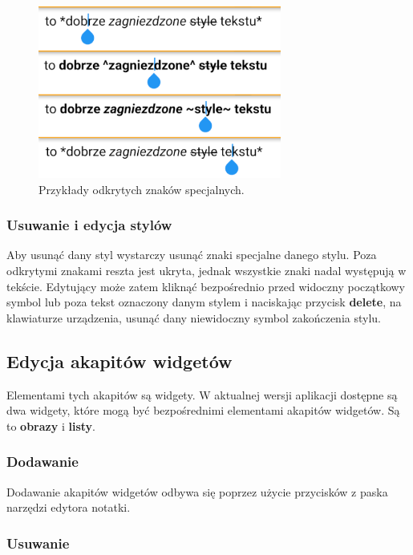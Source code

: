 \begin{figure}[ht]
    \centering
    \includegraphics[width=8cm]{images/pokazywanie_znakow_specjalnych.png}
    \caption{Przykłady odkrytych znaków specjalnych.}
    \vspace{3mm}
\end{figure}

\subsubsection{Usuwanie i edycja stylów}

Aby usunąć dany styl wystarczy usunąć znaki specjalne danego stylu. Poza odkrytymi znakami reszta jest ukryta, jednak wszystkie znaki nadal występują w tekście. Edytujący może zatem kliknąć bezpośrednio przed widoczny początkowy symbol lub poza tekst oznaczony danym stylem i naciskając przycisk \textbf{delete}, na klawiaturze urządzenia, usunąć dany niewidoczny symbol zakończenia stylu.

\subsection{Edycja akapitów widgetów}

Elementami tych akapitów są widgety. W aktualnej wersji aplikacji dostępne są dwa widgety, które mogą być bezpośrednimi elementami akapitów widgetów.
Są to \textbf{obrazy} i \textbf{listy}.

\subsubsection{Dodawanie}
\label{sub:dodawanieWidgetow}

Dodawanie akapitów widgetów odbywa się poprzez użycie przycisków z paska narzędzi edytora notatki.

\subsubsection{Usuwanie}
\label{sub:usuwanieWidgetow}

